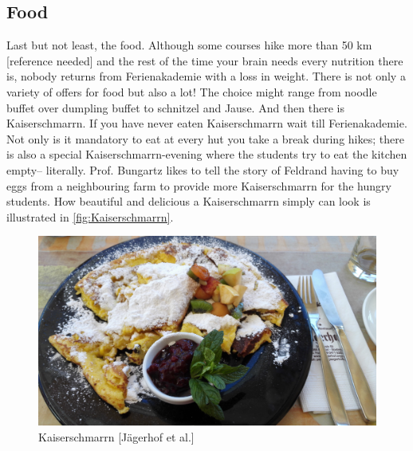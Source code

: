\subsection{Food}
Last but not least, the food. Although some courses hike more than 50 km [reference needed] and the rest of the time your brain needs every nutrition there is, nobody returns from Ferienakademie with a loss in weight. There is not only a variety of offers for food but also a lot! The choice might range from noodle buffet over dumpling buffet to schnitzel and Jause. And then there is Kaiserschmarrn. If you have never eaten Kaiserschmarrn wait till Ferienakademie. Not only is it mandatory to eat at every hut you take a break during hikes; there is also a special Kaiserschmarrn-evening where the students try to eat the kitchen empty-- literally. Prof. Bungartz likes to tell the story of Feldrand having to buy eggs from a neighbouring farm to provide more Kaiserschmarrn for the hungry students. How beautiful and delicious a Kaiserschmarrn simply can look is illustrated in \autoref{fig:Kaiserschmarrn}.
\begin{figure}[ht]%
 	\begin{center}%
 		\includegraphics[scale=0.05]{img/Kaiserschmarrn.jpg}%
 		\caption{Kaiserschmarrn [Jägerhof et al.]}\label{fig:Kaiserschmarrn}%
 	\end{center}%
\end{figure}


